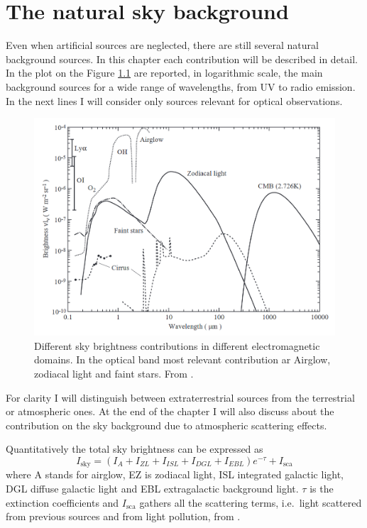 \chapter{The natural sky background}
Even when artificial sources are neglected, there are still several natural background sources. In this chapter each contribution will be described in detail. In the plot on the Figure \ref{fig:natural_sources} are reported, in logarithmic scale, the main background sources for a wide range of wavelengths, from UV to radio emission. In the next lines I will consider only sources relevant for optical observations.
\begin{figure}
	\centering
	\includegraphics[width=.7\textwidth]{./2_natural_sky/natural_sources}
	\caption{Different sky brightness contributions in different electromagnetic domains. In the optical band most relevant contribution ar Airglow, zodiacal light and faint stars. From \cite{leinert19981997}.\label{fig:natural_sources}}
\end{figure}
For clarity I will distinguish between extraterrestrial sources from the terrestrial or atmospheric ones. At the end of the chapter I will also discuss about the contribution on the sky background due to atmospheric scattering effects.

Quantitatively the total sky brightness can be expressed as
\begin{equation}
	I_\text{sky} = (I_A+I_{ZL}+I_{ISL}+I_{DGL}+I_{EBL})e^{-\tau}+I_\text{sca}
\end{equation}
where A stands for airglow, EZ is zodiacal light, ISL integrated galactic light, DGL diffuse galactic light and EBL extragalactic background light. $\tau$ is the extinction coefficients and $I_\text{sca}$ gathers all the scattering terms, i.e.\ light scattered from previous sources and from light pollution, from \cite{leinert19981997}.


